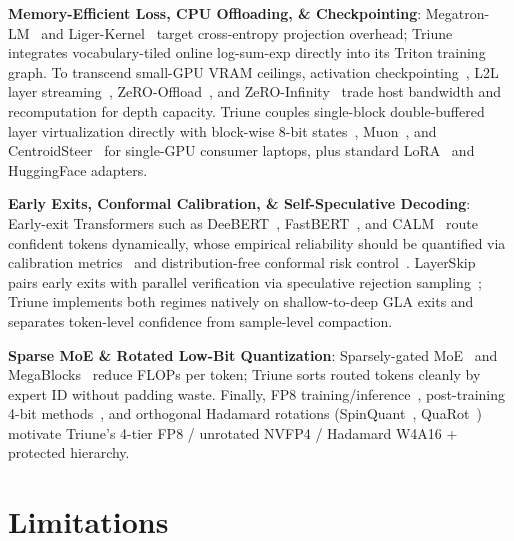 \documentclass[10pt,twocolumn,letterpaper]{article}
\begin{document}
\textbf{Memory-Efficient Loss, CPU Offloading, \& Checkpointing}: Megatron-LM~\cite{shoeybi2019megatron} and Liger-Kernel~\cite{liger2024} target cross-entropy projection overhead; Triune integrates vocabulary-tiled online log-sum-exp directly into its Triton training graph. To transcend small-GPU VRAM ceilings, activation checkpointing~\cite{chen2016training}, L2L layer streaming~\cite{pudipeddi2020l2l}, ZeRO-Offload~\cite{ren2021zerooffload}, and ZeRO-Infinity~\cite{rajbhandari2021zeroinfinity} trade host bandwidth and recomputation for depth capacity. Triune couples single-block double-buffered layer virtualization directly with block-wise 8-bit states~\cite{dettmers2022optimizers}, Muon~\cite{jordan2024muon}, and CentroidSteer~\cite{bhardwaj2026centroidsteer} for single-GPU consumer laptops, plus standard LoRA~\cite{hu2022lora} and HuggingFace adapters.

\textbf{Early Exits, Conformal Calibration, \& Self-Speculative Decoding}: Early-exit Transformers such as DeeBERT~\cite{xin2020deebert}, FastBERT~\cite{liu2020fastbert}, and CALM~\cite{schuster2022confident} route confident tokens dynamically, whose empirical reliability should be quantified via calibration metrics~\cite{guo2017calibration} and distribution-free conformal risk control~\cite{angelopoulos2021gentle,wilson1927probable}. LayerSkip~\cite{elhoushi2024layerskip} pairs early exits with parallel verification via speculative rejection sampling~\cite{leviathan2023fast,chen2023accelerating}; Triune implements both regimes natively on shallow-to-deep GLA exits and separates token-level confidence from sample-level compaction.

\textbf{Sparse MoE \& Rotated Low-Bit Quantization}: Sparsely-gated MoE~\cite{shazeer2017outrageously,fedus2022switch,jiang2024mixtral} and MegaBlocks~\cite{gale2023megablocks} reduce FLOPs per token; Triune sorts routed tokens cleanly by expert ID without padding waste. Finally, FP8 training/inference~\cite{micikevicius2022fp8}, post-training 4-bit methods~\cite{frantar2023gptq,lin2024awq}, and orthogonal Hadamard rotations (SpinQuant~\cite{liu2024spinquant}, QuaRot~\cite{ashkboos2024quarot}) motivate Triune's 4-tier FP8 / unrotated NVFP4 / Hadamard W4A16 + protected hierarchy.

\section{Limitations}
\end{document}
